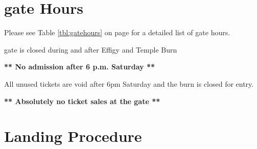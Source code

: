 

\section*{\Gls{gate} Hours}
\label{sec:gate}

Please see Table \ref{tbl:gatehours} on page \pageref{tbl:gatehours} for a detailed list of gate hours.

\Gls{gate} is closed during and after Effigy and Temple Burn

\textbf{** No admission after 6 p.m. Saturday **}
 
All unused tickets are void after 6pm Saturday and the burn is closed for entry. 

\textbf{** Absolutely no ticket sales at the gate **}


\section*{Landing Procedure}
\label{sec:parking}


